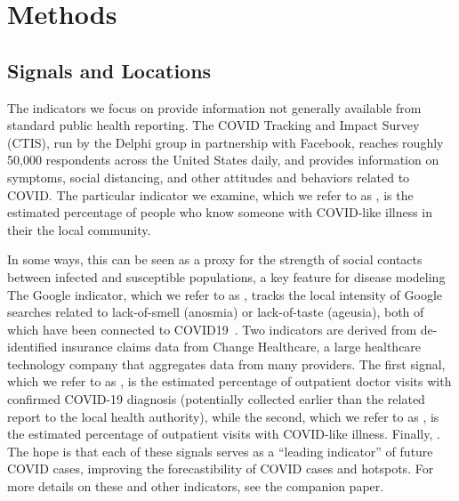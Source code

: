 \documentclass[9pt,twocolumn,twoside,lineno]{pnas-new}
\begin{document}


\section{Methods}

\subsection{Signals and Locations}

The indicators we focus on provide information not generally available from
standard public health reporting. The COVID Tracking and Impact Survey (CTIS),
run by the Delphi group in partnership with Facebook, reaches roughly 50,000
respondents across the United States daily, and provides information on
symptoms, social distancing, and other attitudes and behaviors related to
COVID. The particular indicator we examine, which we refer to as \fb, is the
estimated percentage of people who know someone with COVID-like illness in their
the local community. 

In some ways, this can be seen as a
proxy for the strength of social contacts between infected and susceptible
populations, a key feature for disease modeling~\cite{Zhang1481} The Google
indicator, which we refer to as \gs, tracks the local intensity of Google searches related to lack-of-smell
(anosmia) or lack-of-taste (ageusia), both of which have been connected to
COVID19~\cite{KlopfenAnosmia,vaira2020anosmia}. Two
indicators are derived from de-identified insurance claims data from Change Healthcare, a large
healthcare technology company that aggregates data from many providers. The
first signal, which we refer to as \chngcov, is the estimated percentage of outpatient doctor visits with
confirmed COVID-19 diagnosis (potentially collected earlier than the related
report to the local health authority), while the second, which we
refer to as \chngcli, is the estimated percentage of outpatient
visits with COVID-like illness. Finally, .  The hope is that each
of these signals serves as a ``leading indicator'' of future COVID cases,
improving the forecastibility of COVID cases and hotspots. For more details on
these and other indicators, see the companion paper.

\end{document}
